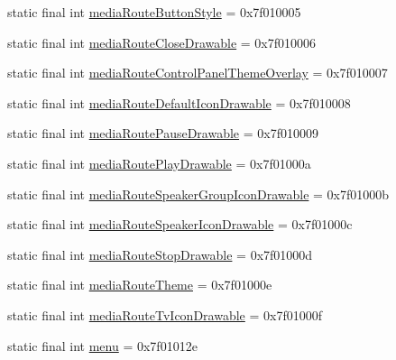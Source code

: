 \begin{CompactItemize}
\item 
static final int \hyperlink{classandroid_1_1support_1_1graphics_1_1drawable_1_1animated_1_1_r_1_1attr_bd5302f6c71bb890d7fa66d29e58a575}{mediaRouteButtonStyle} = 0x7f010005
\item 
static final int \hyperlink{classandroid_1_1support_1_1graphics_1_1drawable_1_1animated_1_1_r_1_1attr_b18c3f8b6861dfab21cafc9319414aec}{mediaRouteCloseDrawable} = 0x7f010006
\item 
static final int \hyperlink{classandroid_1_1support_1_1graphics_1_1drawable_1_1animated_1_1_r_1_1attr_cb4a26d027ff9d7d1a18dc54699efd5b}{mediaRouteControlPanelThemeOverlay} = 0x7f010007
\item 
static final int \hyperlink{classandroid_1_1support_1_1graphics_1_1drawable_1_1animated_1_1_r_1_1attr_1cd8807ab02590bcb43cf078d2be5c65}{mediaRouteDefaultIconDrawable} = 0x7f010008
\item 
static final int \hyperlink{classandroid_1_1support_1_1graphics_1_1drawable_1_1animated_1_1_r_1_1attr_59b113e1a292cf9931e6659fdedcf99c}{mediaRoutePauseDrawable} = 0x7f010009
\item 
static final int \hyperlink{classandroid_1_1support_1_1graphics_1_1drawable_1_1animated_1_1_r_1_1attr_a8d5f9f636ec6073fbd5489f1198111b}{mediaRoutePlayDrawable} = 0x7f01000a
\item 
static final int \hyperlink{classandroid_1_1support_1_1graphics_1_1drawable_1_1animated_1_1_r_1_1attr_70cb1b33d3c0a171ff2ad79a16b31d7f}{mediaRouteSpeakerGroupIconDrawable} = 0x7f01000b
\item 
static final int \hyperlink{classandroid_1_1support_1_1graphics_1_1drawable_1_1animated_1_1_r_1_1attr_35bdfcce525e107feedf8d1f6b68bdf8}{mediaRouteSpeakerIconDrawable} = 0x7f01000c
\item 
static final int \hyperlink{classandroid_1_1support_1_1graphics_1_1drawable_1_1animated_1_1_r_1_1attr_1f88bc6161524670e388e086035c8685}{mediaRouteStopDrawable} = 0x7f01000d
\item 
static final int \hyperlink{classandroid_1_1support_1_1graphics_1_1drawable_1_1animated_1_1_r_1_1attr_54ee972efe4190093a454b0fb0d965d0}{mediaRouteTheme} = 0x7f01000e
\item 
static final int \hyperlink{classandroid_1_1support_1_1graphics_1_1drawable_1_1animated_1_1_r_1_1attr_9045b883b1cd42e854a47e9ccb6207b2}{mediaRouteTvIconDrawable} = 0x7f01000f
\item 
static final int \hyperlink{classandroid_1_1support_1_1graphics_1_1drawable_1_1animated_1_1_r_1_1attr_e535347b070dee5c40adc1be3daa15cc}{menu} = 0x7f01012e

\end{CompactItemize}
